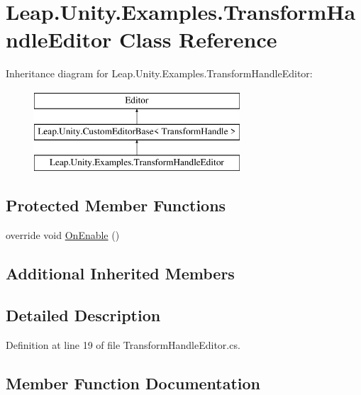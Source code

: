 \hypertarget{class_leap_1_1_unity_1_1_examples_1_1_transform_handle_editor}{}\section{Leap.\+Unity.\+Examples.\+Transform\+Handle\+Editor Class Reference}
\label{class_leap_1_1_unity_1_1_examples_1_1_transform_handle_editor}
Inheritance diagram for Leap.\+Unity.\+Examples.\+Transform\+Handle\+Editor\+:\begin{figure}[H]
\begin{center}
\leavevmode
\includegraphics[height=3.000000cm]{class_leap_1_1_unity_1_1_examples_1_1_transform_handle_editor}
\end{center}
\end{figure}
\subsection*{Protected Member Functions}
\begin{DoxyCompactItemize}
\item 
override void \mbox{\hyperlink{class_leap_1_1_unity_1_1_examples_1_1_transform_handle_editor_aafbb301480e85bce628c6ba3c287e185}{On\+Enable}} ()
\end{DoxyCompactItemize}
\subsection*{Additional Inherited Members}


\subsection{Detailed Description}


Definition at line 19 of file Transform\+Handle\+Editor.\+cs.



\subsection{Member Function Documentation}
\mbox{\label{class_leap_1_1_unity_1_1_examples_1_1_transform_handle_editor_aafbb301480e85bce628c6ba3c287e185}} 

